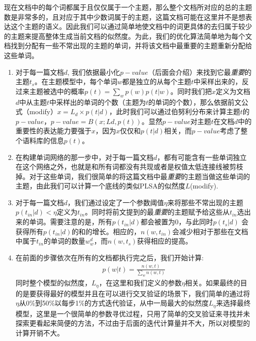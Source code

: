 现在文档中的每个词都属于且仅仅属于一个主题，那么整个文档所对应的总的主题数是非常多的，且对应于其中少数词属于的主题，这篇文档可能在这里并不是想表达这个主题的语义。因此我们可以通过简单地使文档中的词更具体的去归属于较少的主题来提高整体生成当前文档的似然度。为此，我们的优化算法简单地为每个文档找到分配有一些不常出现的主题的单词，并将该文档中最重要的主题重新分配给这些单词。  
   \begin{enumerate}[步骤 1.]
  \item 对于每一篇文档$d$, 我们依据最小化$p-value$（后面会介绍）来找到它最\emph{重要}的主题$t_s$。在主题模型中，每个单词$w$都是独立的从每个主题$t$中采样出来的，反过来主题被选中的概率$p(t) = \sum_{w}p(w)p(t|w)$。同时我们把$x$定义为文档$d$中从主题$t$中采样出的单词的个数（主题为$t$的单词的个数），那么依据前文公式（modify）$x = L_d \times p(t|d)$，此时我们可以通过伯努利分布来计算主题$t$的$p-value$，$p-value = B(x; Ld, p(t))$。显然$p-value$对主题$t$在文档$d$中的重要性的表达能力要强于$x$，因为$x$仅仅和$p(t|d)$相关，而$p-value$考虑了整个语料库的信息$p(t)$。
  \item 在构建单词网络的那一步中，对于每一篇文档$d$，都有可能含有一些单词独立在这个网络之外，也就是和所有词都没有共现或者是权值太低连接线被剪枝掉。对于这些单词，我们很简单的将这篇文档中最\emph{重要}的主题当做这些单词的主题，由此我们可以计算一个底线的类似PLSA的似然度$L$(modify).
  \item 对于每一篇文档$d$，我们通过设定了一个参数阈值$\eta$来将那些不常出现的主题$p(t_{in}|d) < \eta$定义为$t_{in}$。同时将前文提到的最\emph{重要}的主题赋予给这些从$t_{in}$选出来的单词。需要注意的是，所有$p(t_{in}|d)$都会被置为0，与此同时$p(t_s|d)$ 会获得所有$p(t_{in}|d)$的和的增长。相应的，$n(w,t_{in})$会减少相对于那些在文档中属于$t_{in}$的单词的数量$w_w^d$，而$n(w,t_s)$获得相应的提高。
  \item 在前面的步骤依次在所有的文档都执行完之后，我们开始计算:
  \begin{equation}
 \begin{split}
 p(w|t) = \frac{n(w,t)}{\sum_w n(w,t)}
  \end{split}
 \end{equation} 同时整个模型的似然度，$L_{\eta}$，在这里和我们定义的参数$\eta$相关。如果最终的目的是要获得最好的模型并且在可以进行交叉验证的场景下，我们简单的通过将$\eta$从0\%到50\%以每步1\%的方式迭代验证，从中一局最大的似然度$L_{\eta}$来选择最终模型，这里是一个很简单的参数寻优过程，只用了简单的交叉验证来寻找并未探索更看起来简便的方法，不过由于后面的迭代计算量并不大，所以对模型的计算开销不大。
  \end{enumerate}

